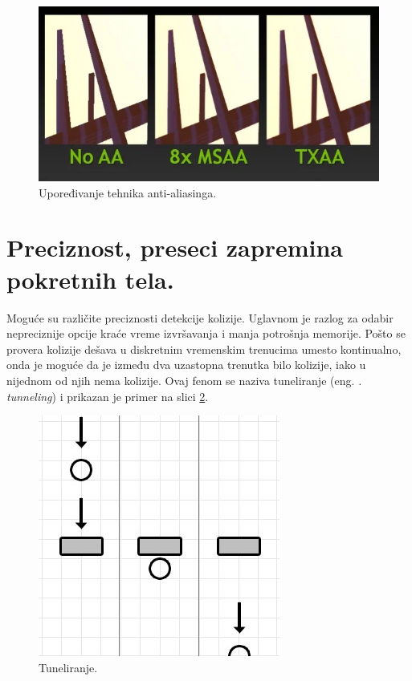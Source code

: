 \documentclass[12pt,oneside]{memoir}
\begin{document}
\begin{figure}[h!]
	\begin{center}
	\includegraphics[scale=0.65]{txaa.png}
	\end{center}
	\caption{Upoređivanje tehnika anti-aliasinga.}
	\label{fig:txaa}
\end{figure}

\section{Preciznost, preseci zapremina pokretnih tela.}

Moguće su različite preciznosti detekcije kolizije. 
Uglavnom je razlog za odabir nepreciznije opcije kraće vreme izvršavanja i manja potrošnja memorije.
Pošto se provera kolizije dešava u diskretnim vremenskim trenucima umesto kontinualno, onda je moguće da 
je između dva uzastopna trenutka bilo kolizije, iako u nijednom od njih nema kolizije. 
Ovaj fenom se naziva tuneliranje (eng. {\em. tunneling}) i prikazan je primer na slici \ref{fig:tunnel}. 

\begin{figure}[h!]
	\begin{center}
	\includegraphics[scale=0.55]{tunnel.png}
	\end{center}
	\caption{Tuneliranje.}
	\label{fig:tunnel}
\end{figure}
\end{document}

